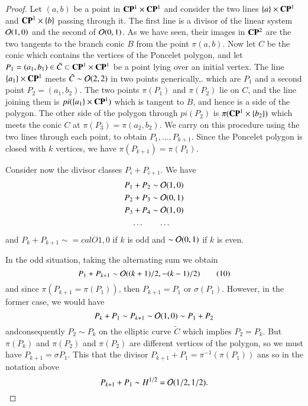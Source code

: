 \begin{proof}
Let $(a, b)$ be a point in $\mathbf{C}\mathbf{P}^{1} \times \mathbf{C}\mathbf{P}^{1}$ and consider the two lines $\{a\} \times \mathbf{C}\mathbf{P}^{1}$ and $\mathbf{C}\mathbf{P}^{1} \times \{b\}$ passing through it. The first line is a divisor of the linear system $\mathcal{O}(1,0)$ and the second of $\mathcal{O}(0,1)$. As we have seen, their images in $\mathbf{C}\mathbf{P}^{2}$ are the two tangents to the branch conic $B$ from the point $\pi(a, b)$. Now let $C$ be the conic which contains the vertices of the Poncelet polygon, and let $P_{1} =(a_{1}, b_{1}) \in \tilde{C} \subset \mathbf{C}\mathbf{P}^{1} \times \mathbf{C}\mathbf{P}^{1}$ be a point lying over an initial vertex. The line $\{a_{1}\} \times \mathbf{C}\mathbf{P}^{1}$ meets $\tilde{C}\sim \mathcal{O}(2,2)$ in two points generically,. which are $P_{1}$ and a second point $P_{2} = (a_{1}, b_{2})$. The two points $\pi(P_{1})$ and $\pi(P_{2})$ lie on $C$, and the line joining them is $pi(\{a_{1}\} \times \mathbf{C}\mathbf{P}^{1})$ which is tangent to $B$, and hence is a side of the polygon. The other side of the polygon through $pi(P_{2})$ is $\pi(\mathbf{C}\mathbf{P}^{1} \times\{b_{2}\})$ which meets the conic $C$ at $\pi(P_{3}) = \pi(a_{2}, b_{2})$. We carry on this procedure using the two lines through each point, to obtain $P_{1}, \ldots, P_{k+1}$. Since the Poncelet polygon is closed with $k$ vertices, we have $\pi(P_{k+1}) = \pi(P_{1})$.

Consider now the divisor classes $P_{i} + P_{i+1}$. We have
\begin{align*}
P_{1}+ P_{2} &\sim \mathcal{O}(1,0)\\
P_{2}+ P_{3} &\sim \mathcal{O}(0,1)\\
P_{3}+ P_{4} &\sim \mathcal{O}(1,0)\\
\ldots  \quad     & \quad \ldots
\end{align*}
and $P_{k} + P_{k+1} \sim =calO{1, 0}$ if $k$ is odd and $\sim \mathcal{O}(0,1)$ if $k$ is even.

In the odd situation, taking the alternating sum we obtain
\begin{equation*}\label{art7-eq-10}
P_{1} +P_{k+1} \sim \mathcal{O} ((k+1)/2, -(k-1)/2)\tag{10}
\end{equation*}
and since $\pi(P_{k+1} = \pi(P_{1}))$, then $P_{k+1} = P_{1}$ or  $\sigma(P_{1})$. However, in the former case, we would have
$$
P_{k}+P_{1}\sim P_{k+1}\sim \mathcal{O}(1,0)\sim P_{1}+P_{2}
$$
and\pageoriginale consequently $P_{2}\sim P_{k}$ on the elliptic curve $\tilde{C}$ which implies $P_{2} = P_{k}$. But $\pi(P_{k})$ and $\pi(P_{2})$ and $\pi(P_{2})$ are different vertices of the polygon, so we must have $P_{k+1} = \sigma P_{1}$. This that the divisor $P_{k+1} +P_{1} = \pi^{-1}(\pi(P_{1}))$ ans so in the notation above
$$
P_{k+1} + P_{1}\sim H^{1/2} = \mathcal{O}(1/2, 1/2).
$$


\end{proof}
